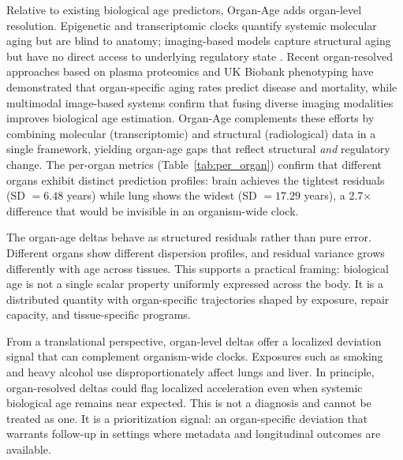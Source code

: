 \documentclass[10pt,twocolumn]{article}
\begin{document}
Relative to existing biological age predictors, Organ-Age adds organ-level resolution. Epigenetic
and transcriptomic clocks quantify systemic molecular aging but are blind to anatomy; imaging-based
models capture structural aging but have no direct access to underlying regulatory state
\cite{putin2016deepaging}. Recent organ-resolved approaches based on plasma proteomics
\cite{oh2023organ} and UK Biobank phenotyping \cite{tian2023heterogeneous} have demonstrated
that organ-specific aging rates predict disease and mortality, while multimodal image-based
systems \cite{wang2024multimodal} confirm that fusing diverse imaging modalities improves
biological age estimation. Organ-Age complements these efforts by combining molecular
(transcriptomic) and structural (radiological) data in a single framework, yielding organ-age
gaps that reflect structural \emph{and} regulatory change. The per-organ metrics (Table~\ref{tab:per_organ})
confirm that different organs exhibit distinct prediction profiles: brain achieves the tightest
residuals (SD $= 6.48$ years) while lung shows the widest (SD $= 17.29$ years), a 2.7$\times$
difference that would be invisible in an organism-wide clock.

The organ-age deltas behave as structured residuals rather than pure error. Different organs show
different dispersion profiles, and residual variance grows differently with age across tissues.
This supports a practical framing: biological age is not a single scalar property uniformly expressed
across the body. It is a distributed quantity with organ-specific trajectories shaped by exposure,
repair capacity, and tissue-specific programs.

From a translational perspective, organ-level deltas offer a localized deviation signal that can
complement organism-wide clocks. Exposures such as smoking and heavy alcohol use disproportionately
affect lungs and liver. In principle, organ-resolved deltas could flag localized acceleration even
when systemic biological age remains near expected. This is not a diagnosis and cannot be treated as
one. It is a prioritization signal: an organ-specific deviation that warrants follow-up in settings
where metadata and longitudinal outcomes are available.
\end{document}
